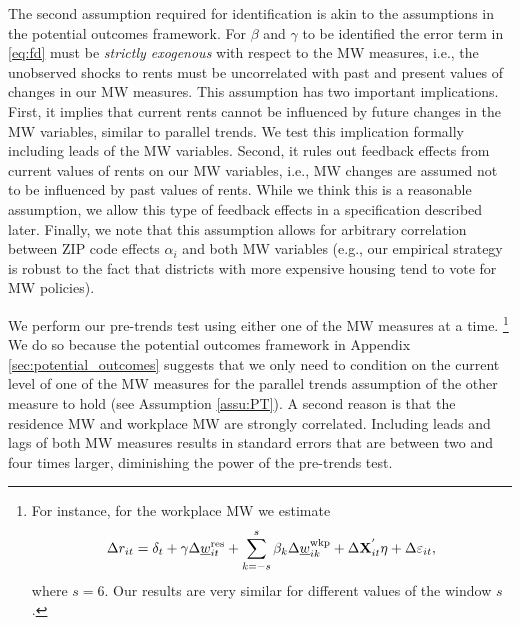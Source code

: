 The second assumption required for identification is akin to the assumptions 
in the potential outcomes framework.
For $\beta$ and $\gamma$ to be identified the error term in \eqref{eq:fd} must 
be \textit{strictly exogenous} with respect to the MW measures, i.e., 
the unobserved shocks to rents must be uncorrelated with past and present 
values of changes in our MW measures.
This assumption has two important implications.
First,
it implies that current rents cannot be influenced by future changes in the MW 
variables, similar to parallel trends.
We test this implication formally including leads of the MW variables.
Second,
it rules out feedback effects from current values of rents on our MW variables, 
i.e., MW changes are assumed not to be influenced by past values of rents.
While we think this is a reasonable assumption, we allow this type of feedback 
effects in a specification described later.
Finally, we note that this assumption allows for arbitrary correlation between 
ZIP code effects $\alpha_i$ and both MW variables 
(e.g., our empirical strategy is robust to the fact that districts with more
expensive housing tend to vote for MW policies).

We perform our pre-trends test using either one of the MW measures at a time.%
\footnote{For instance, for the workplace MW we estimate
\begin{equation*}
    \Delta r_{it} = \delta_t
                  + \gamma \Delta \underline{w}^{\text{res}}_{it} 
                  + \sum_{k=-s}^{s} \beta_k \Delta \underline{w}^{\text{wkp}}_{ik}
                  + \Delta \mathbf{X}^{'}_{it}\eta
                  + \Delta \varepsilon_{it} ,
\end{equation*}
where $s=6$.
Our results are very similar for different values of the window $s$.}
We do so because the potential outcomes framework in Appendix 
\ref{sec:potential_outcomes} suggests that we only need to condition on the
current level of one of the MW measures for the parallel trends assumption
of the other measure to hold (see Assumption \ref{assu:PT}).
A second reason is that the residence MW and workplace MW are strongly 
correlated.
Including leads and lags of both MW measures results in standard errors
that are between two and four times larger, diminishing the power of the 
pre-trends test.

